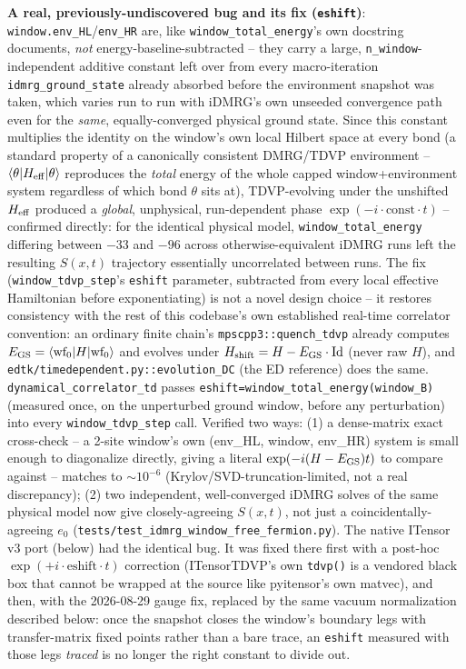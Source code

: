 \documentclass[11pt]{article}
\begin{document}
\textbf{A real, previously-undiscovered bug and its fix (\texttt{eshift})}:
\texttt{window.env\_HL}/\texttt{env\_HR} are, like
\texttt{window\_total\_energy}'s own docstring documents, \emph{not}
energy-baseline-subtracted -- they carry a large, \texttt{n\_window}-
independent additive constant left over from every macro-iteration
\texttt{idmrg\_ground\_state} already absorbed before the environment
snapshot was taken, which varies run to run with iDMRG's own unseeded
convergence path even for the \emph{same}, equally-converged physical
ground state. Since this constant multiplies the identity on the
window's own local Hilbert space at every bond (a standard property of
a canonically consistent DMRG/TDVP environment -- $\langle\theta|
H_{\rm eff}|\theta\rangle$ reproduces the \emph{total} energy of the
whole capped window+environment system regardless of which bond
$\theta$ sits at), TDVP-evolving under the unshifted $H_{\rm eff}$
produced a \emph{global}, unphysical, run-dependent phase
$\exp(-i\cdot\text{const}\cdot t)$ -- confirmed directly: for the
identical physical model, \texttt{window\_total\_energy} differing
between $-33$ and $-96$ across otherwise-equivalent iDMRG runs left the
resulting $S(x,t)$ trajectory essentially uncorrelated between runs.
The fix (\texttt{window\_tdvp\_step}'s \texttt{eshift} parameter,
subtracted from every local effective Hamiltonian before exponentiating)
is not a novel design choice -- it restores consistency with the rest of
this codebase's own established real-time correlator convention: an
ordinary finite chain's \texttt{mpscpp3::quench\_tdvp} already computes
$E_{\rm GS}=\langle\text{wf}_0|H|\text{wf}_0\rangle$ and evolves under
$H_{\rm shift}=H-E_{\rm GS}\cdot\text{Id}$ (never raw $H$), and
\texttt{edtk/timedependent.py::evolution\_DC} (the ED reference) does the
same. \texttt{dynamical\_correlator\_td} passes
\texttt{eshift=window\_total\_energy(window\_B)} (measured once, on the
unperturbed ground window, before any perturbation) into every
\texttt{window\_tdvp\_step} call. Verified two ways: (1) a dense-matrix
exact cross-check -- a 2-site window's own (env\_HL, window, env\_HR)
system is small enough to diagonalize directly, giving a literal
$\exp(-i(H-E_{\rm GS})t)$ to compare against -- matches to $\sim 10^{-6}$
(Krylov/SVD-truncation-limited, not a real discrepancy); (2) two
independent, well-converged iDMRG solves of the same physical model now
give closely-agreeing $S(x,t)$, not just a coincidentally-agreeing $e_0$
(\texttt{tests/test\_idmrg\_window\_free\_fermion.py}). The native
ITensor v3 port (below) had the identical bug. It was fixed there first
with a post-hoc $\exp(+i\cdot\text{eshift}\cdot t)$ correction
(ITensorTDVP's own \texttt{tdvp()} is a vendored black box that cannot be
wrapped at the source like pyitensor's own matvec), and then, with the
2026-08-29 gauge fix, replaced by the same vacuum normalization described
below: once the snapshot closes the window's boundary legs with
transfer-matrix fixed points rather than a bare trace, an
\texttt{eshift} measured with those legs \emph{traced} is no longer the
right constant to divide out.
\end{document}
